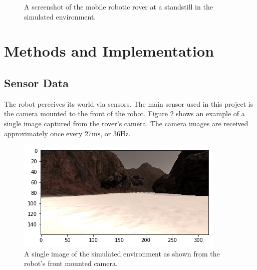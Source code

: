 \documentclass[a4paper]{article}
\begin{document}
\begin{figure}[h]
\centering
{}
\caption{A screenshot of the mobile robotic rover at a standstill in the simulated environment.}
\end{figure}

\newpage

\section{Methods and Implementation}
\subsection{Sensor Data}
The robot perceives its world via sensors. The main sensor used in this project is the camera mounted to the front of the robot. Figure 2 shows an example of a single image captured from the rover's camera. The camera images are received approximately once every 27$\si{\milli\second}$, or 36$\si{\hertz}$.

\begin{figure}[h]
\centering
\includegraphics[scale=0.5]{image2}
\caption{A single image of the simulated environment as shown from the robot's front mounted camera.}
\end{figure}
\end{document}
